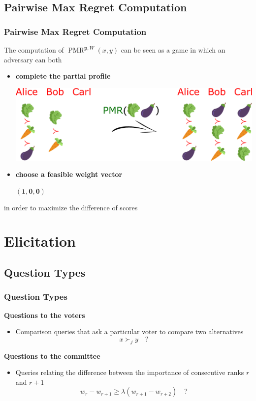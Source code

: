 \documentclass{beamer}
\newcommand{\pprofile}{{\bm{p}}}%
\newcommand{\pref}{\succ}%
\DeclareMathOperator{\PMR}{PMR}
\begin{document}
\subsection{Pairwise Max Regret Computation}
\begin{frame}
	\frametitle{Pairwise Max Regret Computation}
	The computation of $\PMR^{\pprofile,W}(x,y)$ can be seen as a game in which an adversary can both
	\begin{itemize}
		\item \textbf{complete the partial profile}\\
		\medskip
		\begin{center}
			\includegraphics[scale=0.35]{completion.png}
		\end{center}
		
		\item \textbf{choose a feasible weight vector}\\
		\medskip
		\centerline{\color{red}$\mathbf{(1,0,0)}$}
	\end{itemize}
	\medskip
	in order to maximize the difference of scores
\end{frame}

\section{Elicitation}
\subsection{Question Types}
	\begin{frame}
		\frametitle{Question Types}
		\textbf{Questions to the voters}
		\begin{itemize}
			\item[] Comparison queries that ask a particular voter to compare two alternatives
			\color{blue}\[x \pref_j y \quad ?\]
		\end{itemize}
		\textbf{Questions to the committee}
		\begin{itemize}
			\item[] Queries relating the difference between the importance of consecutive ranks $r$ and $r+1$
			\color{blue} \[ w_{r} - w_{r+1} \geq \lambda (w_{r+1} - w_{r+2}) \quad ? \] 
		\end{itemize}
	\end{frame}
	
\end{document}
